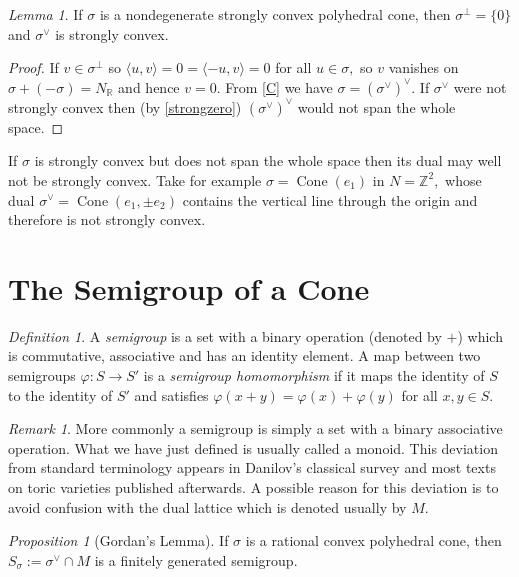 \documentclass[BSc]{usydthesis}
\numberwithin{equation}{chapter}
\theoremstyle{remark}
\newtheorem{Definition}[equation]{Definition}
\newtheorem{Proposition}[equation]{Proposition}
\newtheorem{Lemma}[equation]{Lemma}
\newtheorem{Remark}[equation]{Remark}
\newcommand{\R}{\mathbb{R}}
\newcommand{\Z}{\mathbb{Z}}
\newcommand{\V}{\vee}
\DeclareMathOperator{\Cone}{Cone}
\begin{document}
\begin{Lemma}\label{DualIsStrong}
 If $\sigma$ is a nondegenerate strongly convex polyhedral cone, then $\sigma^{\perp}=\{ 0\}$ and $\sigma^{\V}$ is strongly convex. 
\end{Lemma}

\begin{proof}
 If $v\in \sigma^{\perp}$ so $\langle u, v \rangle =0 = \langle -u, v \rangle=0$ for all $u\in \sigma,$ so $v$ vanishes on $\sigma + (-\sigma) = N_{\R}$ and hence $v=0.$ From \ref{C} we have $\sigma =(\sigma^{\V})^{\V}.$ If $\sigma^{\V}$ were not strongly convex then (by \ref{strongzero}) $(\sigma^{\V})^{\V}$ would not span the whole space. 
\end{proof}

If $\sigma$ is strongly convex but does not span the whole space then its dual may well not be strongly convex. Take for example $\sigma = \Cone(e_1)$ in $N=\Z^2,$ whose dual $\sigma^{\V} = \Cone(e_1,\pm e_2)$ contains the vertical line through the origin and therefore is not strongly convex.

\section{The Semigroup of a Cone}

\begin{Definition}
 A {\em semigroup} is a set with a binary operation (denoted by $+$) which is commutative, associative and has an identity element. A map between two semigroups $\varphi: S\to S'$ is a {\em semigroup homomorphism} if it maps the identity of $S$ to the identity of $S'$ and satisfies $\varphi(x+y) = \varphi(x) + \varphi(y)$ for all $x,y\in S.$
\end{Definition}

\begin{Remark}
 More commonly a semigroup is simply a set with a binary associative operation. What we have just defined is usually called a monoid. This deviation from standard terminology appears in Danilov's classical survey \cite{Danilov} and most texts on toric varieties published afterwards. A possible reason for this deviation is to avoid confusion with the dual lattice which is denoted usually by $M.$
\end{Remark}

\begin{Proposition}[Gordan's Lemma]\label{Gordan}
If $\sigma$ is a rational convex polyhedral cone, then $S_{\sigma}:= \sigma^{\V} \cap M$ is a finitely generated semigroup.
\end{Proposition}
\end{document}
